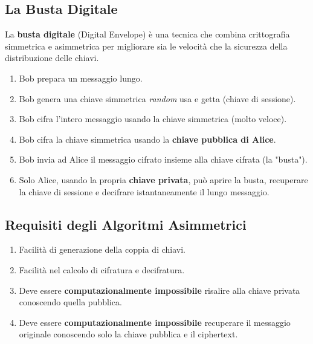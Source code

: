 \subsection{La Busta Digitale}
La \textbf{busta digitale} (Digital Envelope) è una tecnica che combina crittografia simmetrica e asimmetrica per migliorare sia le velocità che la sicurezza della distribuzione delle chiavi.
\begin{enumerate}
    \item Bob prepara un messaggio lungo.
    \item Bob genera una chiave simmetrica \textit{random} usa e getta (chiave di sessione).
    \item Bob cifra l'intero messaggio usando la chiave simmetrica (molto veloce).
    \item Bob cifra la chiave simmetrica usando la \textbf{chiave pubblica di Alice}.
    \item Bob invia ad Alice il messaggio cifrato insieme alla chiave cifrata (la "busta").
    \item Solo Alice, usando la propria \textbf{chiave privata}, può aprire la busta, recuperare la chiave di sessione e decifrare istantaneamente il lungo messaggio.
\end{enumerate}

\subsection{Requisiti degli Algoritmi Asimmetrici}
\begin{enumerate}
    \item Facilità di generazione della coppia di chiavi.
    \item Facilità nel calcolo di cifratura e decifratura.
    \item Deve essere \textbf{computazionalmente impossibile} risalire alla chiave privata conoscendo quella pubblica.
    \item Deve essere \textbf{computazionalmente impossibile} recuperare il messaggio originale conoscendo solo la chiave pubblica e il ciphertext.
\end{enumerate}

